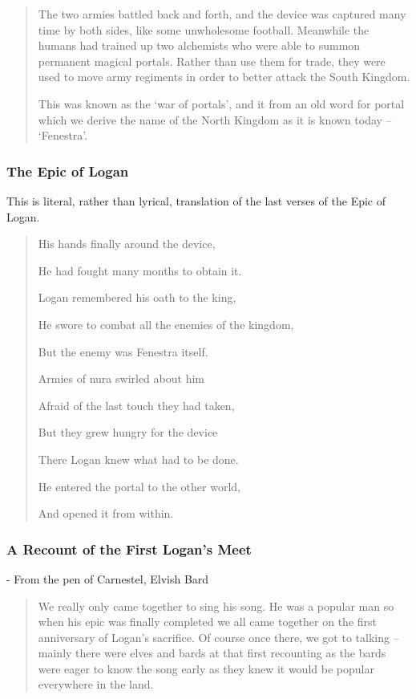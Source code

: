 \begin{multicols}{2}
\begin{quotation}
	The two armies battled back and forth, and the device was captured many time by both sides, like some unwholesome football.
	Meanwhile the humans had trained up two alchemists who were able to summon permanent magical portals.
	Rather than use them for trade, they were used to move army regiments in order to better attack the South Kingdom.

	This was known as the `war of portals', and it from an old word for portal which we derive the name of the North Kingdom as it is known today -- `Fenestra'.

\end{quotation}

\subsubsection{The Epic of Logan}

This is literal, rather than lyrical, translation of the last verses of the Epic of Logan.

\begin{verse}

	His hands finally around the device,

	He had fought many months to obtain it.

	Logan remembered his oath to the king,

	He swore to combat all the enemies of the kingdom,

	But the enemy was Fenestra itself.

	Armies of nura swirled about him

	Afraid of the last touch they had taken,

	But they grew hungry for the device

	There Logan knew what had to be done.

	He entered the portal to the other world,

	And opened it from within.

\end{verse}

\subsubsection{A Recount of the First Logan's Meet}

- From the pen of Carnestel, Elvish Bard

\begin{quotation}

	We really only came together to sing his song.
	He was a popular man so when his epic was finally completed we all came together on the first anniversary of Logan's sacrifice.
	Of course once there, we got to talking -- mainly there were elves and bards at that first recounting as the bards were eager to know the song early as they knew it would be popular everywhere in the land.


\end{quotation}
\end{multicols}
